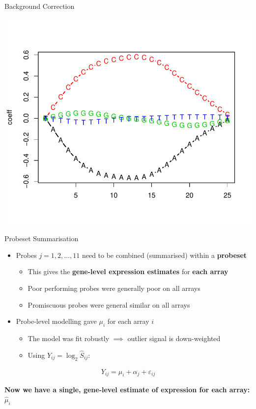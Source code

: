 \documentclass[aspectratio=169,11pt]{beamer}
\begin{document}
\begin{frame}{Background Correction}

	\begin{center}
\includegraphics[scale=0.55]{figures/GCRMA_baseprofile.pdf} 
	\end{center}
	
\end{frame}

\begin{frame}{Probeset Summarisation}

	\begin{itemize}
		\item Probes $j = 1, 2, \ldots, 11$ need to be combined (summarised) within a \textbf{probeset}
		\begin{itemize}
			\item This gives the \textbf{gene-level expression estimates} for \textbf{each array}
			\item Poor performing probes were generally poor on all arrays
			\item Promiscuous probes were general similar on all arrays
		\end{itemize}	
		\item Probe-level modelling gave $\mu_i$ for each array $i$
		\begin{itemize}
			\item The model was fit robustly $\implies$ outlier signal is down-weighted
			\item Using $Y_{ij} = \log_2 \hat{S}_{ij}$:
		\end{itemize}
	\end{itemize}

	\begin{align*}
		Y_{ij} = \mu_i + \alpha_j + \varepsilon_{ij}
	\end{align*}
	
	\textbf{Now we have a single, gene-level estimate of expression for each array:} $\hat{\mu}_{i}$
	
\end{frame}
\end{document}
